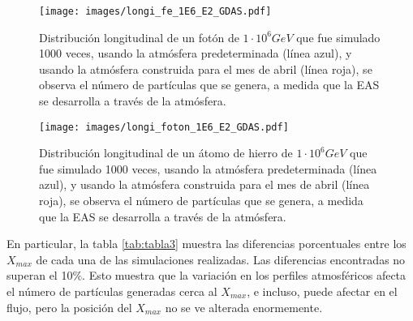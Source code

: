 \begin{figure}[htb!]
\centering
\texttt{[image: images/longi\_fe\_1E6\_E2\_GDAS.pdf]}
\caption[Distribución longitudinal de un fotón de $1\cdot 10^{6} GeV$.]{Distribución longitudinal de un fotón de $1\cdot 10^{6} GeV$ que fue simulado 1000 veces, usando la atmósfera predeterminada (línea azul), y usando la atmósfera construida para el mes de abril (línea roja), se observa el número de partículas que se genera, a medida que la EAS se desarrolla a través de la atmósfera.}
\label{fig:fig24}
\end{figure}

\begin{figure}[htb!]
\centering
\texttt{[image: images/longi\_foton\_1E6\_E2\_GDAS.pdf]}
\caption[Distribución longitudinal de un átomo de hierro de $1\cdot 10^{6} GeV$.]{Distribución longitudinal de un átomo de hierro de $1\cdot 10^{6} GeV$ que fue simulado 1000 veces, usando la atmósfera predeterminada (línea azul), y usando la atmósfera construida para el mes de abril (línea roja), se observa el número de partículas que se genera, a medida que la EAS se desarrolla a través de la atmósfera.}
\label{fig:fig25}
\end{figure}

En particular, la tabla \ref{tab:tabla3} muestra las diferencias porcentuales entre los $X_{max}$ de cada una de las simulaciones realizadas. Las diferencias encontradas no superan el 10$\%$. Esto muestra que la variación en los perfiles atmosféricos afecta el número de partículas generadas cerca al $X_{max}$, e incluso, puede afectar en el flujo, pero la posición del  $X_{max}$ no se ve alterada enormemente.


